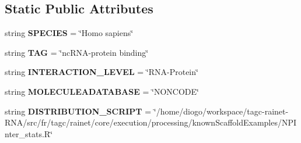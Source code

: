 \subsection*{Static Public Attributes}
\begin{DoxyCompactItemize}
\item 
\hypertarget{classNPInterPredictionValidation__variant_1_1NPInterPredictionValidation_ad1f0fcdd2e841afe8c8d11f2ecea6ac9}{string {\bfseries S\-P\-E\-C\-I\-E\-S} = \char`\"{}Homo sapiens\char`\"{}}\label{classNPInterPredictionValidation__variant_1_1NPInterPredictionValidation_ad1f0fcdd2e841afe8c8d11f2ecea6ac9}

\item 
\hypertarget{classNPInterPredictionValidation__variant_1_1NPInterPredictionValidation_a223139f74fd3ba07a84b4787d0bfb086}{string {\bfseries T\-A\-G} = \char`\"{}nc\-R\-N\-A-\/protein binding\char`\"{}}\label{classNPInterPredictionValidation__variant_1_1NPInterPredictionValidation_a223139f74fd3ba07a84b4787d0bfb086}

\item 
\hypertarget{classNPInterPredictionValidation__variant_1_1NPInterPredictionValidation_a360a502b9aa7504b719100be8f4a7d20}{string {\bfseries I\-N\-T\-E\-R\-A\-C\-T\-I\-O\-N\-\_\-\-L\-E\-V\-E\-L} = \char`\"{}R\-N\-A-\/Protein\char`\"{}}\label{classNPInterPredictionValidation__variant_1_1NPInterPredictionValidation_a360a502b9aa7504b719100be8f4a7d20}

\item 
\hypertarget{classNPInterPredictionValidation__variant_1_1NPInterPredictionValidation_ad5818aacc18d381a82e5a0b85a049ed8}{string {\bfseries M\-O\-L\-E\-C\-U\-L\-E\-A\-D\-A\-T\-A\-B\-A\-S\-E} = \char`\"{}N\-O\-N\-C\-O\-D\-E\char`\"{}}\label{classNPInterPredictionValidation__variant_1_1NPInterPredictionValidation_ad5818aacc18d381a82e5a0b85a049ed8}

\item 
\hypertarget{classNPInterPredictionValidation__variant_1_1NPInterPredictionValidation_a837c1e42ea1aa154fadcd79c3529c9f2}{string {\bfseries D\-I\-S\-T\-R\-I\-B\-U\-T\-I\-O\-N\-\_\-\-S\-C\-R\-I\-P\-T} = \char`\"{}/home/diogo/workspace/tagc-\/rainet-\/R\-N\-A/src/fr/tagc/rainet/core/execution/processing/known\-Scaffold\-Examples/N\-P\-Inter\-\_\-stats.\-R\char`\"{}}\label{classNPInterPredictionValidation__variant_1_1NPInterPredictionValidation_a837c1e42ea1aa154fadcd79c3529c9f2}

\end{DoxyCompactItemize}


